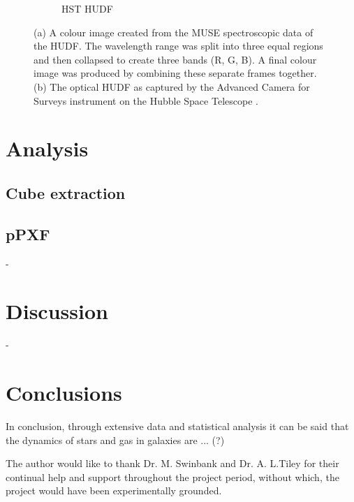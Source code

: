 \documentclass[12pt, twocolumn]{revtex4}    %
\begin{document}
\begin{figure}
\begin{subfigure}[b]{0.4\textwidth}
    \caption{HST HUDF}
    \label{fig:hubble_ultra_deep_field}
  \end{subfigure}
  \caption[]{(a) A colour image created from the MUSE spectroscopic data of the HUDF. The wavelength range was split into three equal regions and then collapsed to create three bands (R, G, B). A final colour image was produced by combining these separate frames together. (b) The optical HUDF as captured by the Advanced Camera for Surveys instrument on the Hubble Space Telescope \cite{hudf_image}. }
\end{figure}

\twocolumngrid

\section{Analysis} 

\subsection{Cube extraction}

\subsection{pPXF} 

-

\section{Discussion} 

-

\section{Conclusions}
 
In conclusion, through extensive data and statistical analysis it can be said that the dynamics of stars and gas in galaxies are ... (?) 

\begin{acknowledgments}
The author would like to thank Dr. M. Swinbank and Dr. A. L.Tiley for their continual help and support throughout the project period, without which, the project would have been experimentally grounded.
\end{acknowledgments}



\end{document}
